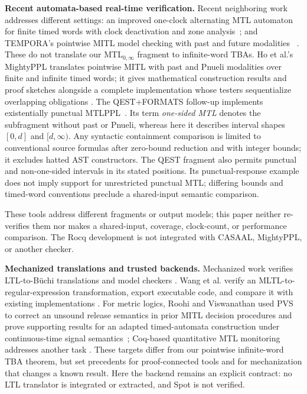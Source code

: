 \documentclass[10pt,journal,compsoc]{IEEEtran}
\newcommand{\runinhead}[1]{\par\smallskip\noindent\textbf{#1}\enspace}
\begin{document}
\runinhead{Recent automata-based real-time verification.}
Recent neighboring work addresses different settings: an improved one-clock
alternating MTL automaton for finite timed words with clock deactivation and
zone analysis~\cite{bouyer_srivathsan_vishwanath_fossacs25}; and TEMPORA's
pointwise MITL model checking with past and future modalities
~\cite{akshay_et_al_tempora26}. These do not
translate our MTL$_{0,\infty}$ fragment to infinite-word TBAs.
Ho et al.'s MightyPPL translates pointwise MITL with past and Pnueli
modalities over finite and infinite timed words; it gives mathematical
construction results and proof sketches alongside a complete implementation
whose testers sequentialize overlapping obligations
\cite{mightyppl_tacas26}. The QEST+FORMATS follow-up implements existentially
punctual MTLPPL~\cite{mightyppl_qest26,mightyppl_qest_arxiv26}. Its term
\emph{one-sided MTL} denotes the subfragment without past or Pnueli, whereas
here it describes interval shapes $[0,d]$ and $[d,\infty)$. Any syntactic
containment comparison is limited to conventional source formulas after
zero-bound reduction and with integer bounds; it excludes hatted AST
constructors. The QEST fragment also permits punctual and non-one-sided
intervals in its stated positions. Its punctual-response example does not
imply support for unrestricted punctual MTL; differing bounds and timed-word
conventions preclude a shared-input semantic comparison.

These tools address different fragments or output models; this paper neither
re-verifies them nor makes a shared-input, coverage, clock-count, or
performance comparison. The Rocq development is not integrated with CASAAL,
MightyPPL, or another checker.

\runinhead{Mechanized translations and trusted backends.}
Mechanized work verifies LTL-to-B\"uchi translations and model checkers
\cite{schimpf_tphols09,cava_cav13,ltl_to_gba_afp,seidl_sickert_afp19}.
Wang et al. verify an MLTL-to-regular-expression transformation, export
executable code, and compare it with existing implementations
\cite{wang_mltl_tacas25}. For metric logics, Roohi and Viswanathan used PVS
to correct an unsound release semantics in prior MITL decision procedures
and prove supporting results for an adapted timed-automata construction
under continuous-time signal semantics~\cite{roohi_viswanathan_vmcai18};
Coq-based quantitative MTL monitoring addresses another task
\cite{chattopadhyay_mamouras_rv20}. These targets differ from our pointwise
infinite-word TBA theorem, but set precedents for proof-connected tools and
for mechanization that changes a known result. Here the backend remains an
explicit contract: no LTL translator is integrated or extracted, and Spot
is not verified.
\end{document}
